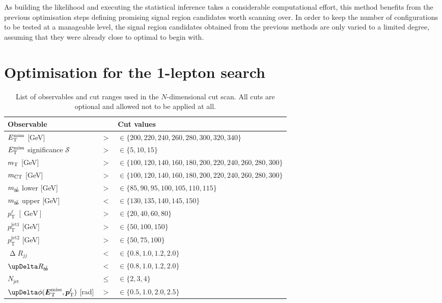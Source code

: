 As building the likelihood and executing the statistical inference takes a considerable computational effort, this method benefits from the previous optimisation steps defining promising signal region candidates worth scanning over.
In order to keep the number of configurations to be tested at a manageable level, the signal region candidates obtained from the previous methods are only varied to a limited degree, assuming that they were already close to optimal to begin with.

\section{Optimisation for the 1-lepton search}

\begin{table}
	\centering
	\small
	\setlength\heavyrulewidth{0.2ex}
	\caption{List of observables and cut ranges used in the $N$-dimensional cut scan. All cuts are optional and allowed not to be applied at all.}
	\begin{tabular} {l c l}
		\toprule
		Observable &  & Cut values \\ 
		\midrule
		$E_{\textrm{T}}^{\textrm{miss}}$ [GeV]& $>$ & $\in \{200,220,240,260,280,300,320,340\}$ \\
		$E_{\textrm{T}}^{\textrm{miss}}$ significance $\mathcal{S}$ & $>$ & $\in \{5,10,15\}$ \\
		$m_{\textrm{T}}$ [GeV]& $>$ & $\in \{100, 120, 140,160,180,200,220,240,260,280, 300\}$ \\
		$m_{\textrm{CT}}$ [GeV]& $>$ & $\in \{100, 120, 140,160,180,200,220,240,260,280, 300\}$ \\
		$m_{b\hspace{-0.06em}\bar{b}}$ lower [GeV]& $>$ & $\in \{85,90,95,100,105,110,115\}$ \\
		$m_{b\hspace{-0.06em}\bar{b}}$ upper [GeV]& $<$ & $\in \{130,135,140,145,150\}$ \\
		$p_\textrm{T}^\ell$ $[\SI{}{\GeV}]$& $>$ & $\in \{20, 40, 60, 80\}$ \\
		$p_\textrm{T}^\mathrm{jet1}$ [GeV]& $>$ & $\in \{50, 100, 150\}$ \\
		$p_\textrm{T}^\mathrm{jet2}$ [GeV]& $>$ & $\in \{50, 75, 100\}$ \\	
		$\upDelta R_{jj}$ & $<$ & $\in \{0.8,1.0,1.2,2.0\}$ \\
		$\upDelta R_{b\hspace{-0.06em}\bar{b}}$ & $<$ & $\in \{0.8,1.0,1.2,2.0\}$ \\
		$N_\mathrm{jet}$ & $\leq$ & $\in \{2,3,4\}$ \\			
		$\upDelta\phi (\vetmiss,\vptlep )$ [rad]& $>$ & $\in \{0.5,1.0,2.0,2.5\}$ \\
		\bottomrule					
	\end{tabular}
	\label{tab:cut_scan}   
\end{table}

